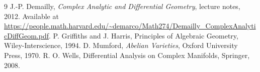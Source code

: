\documentclass[12pt]{article}
\begin{document}
\begin{thebibliography}{9}
J.-P. Demailly,
\textit{Complex Analytic and Differential Geometry}, lecture notes, 2012.
Available at \url{https://people.math.harvard.edu/~demarco/Math274/Demailly_ComplexAnalyticDiffGeom.pdf}.
     P. Griffiths and J. Harris, Principles of Algebraic Geometry, Wiley-Interscience, 1994.
 D. Mumford, \textit{Abelian Varieties}, Oxford University Press, 1970.
     R. O. Wells, Differential Analysis on Complex Manifolds, Springer, 2008.
\end{thebibliography}
\end{document}
